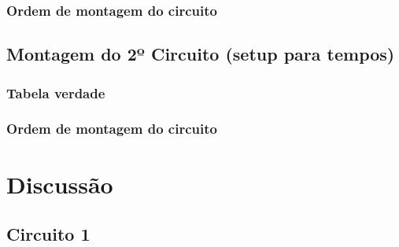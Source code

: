 \documentclass[12pts]{article}
\begin{document}
\subsubsection{Ordem de montagem do circuito}
\iffalse
\begin{itemize}
\item Primeiramente a fonte de alimentação foi escolhida e foi fixada o mesmo GND para as duas 
saidas.
\item A protoboard foi alimentada.
\item CI NAND (74LS00) foi posicionado e alimentado.
\item Os pinos 1 e 2 do CI foram ligados e a fonte de alimentação variável foi conectada no
primeiro pino.
\item O pino 3 (saida da porta NAND) foi conectado ao multímetro digital de forma a verificar
os valores de saída da porta lógica.
\item Foi aumentado o valor da fonte variável de na escala de  0,5V.
\item Os valores de saída foram anotados.
\item O CI NAND (74LS00), da familia TTL foi substituido pelo CI NAND (74HC00),
da familia CMOS, para fazer novas anotaçoes.
\item O circuito eletrônico teve comportamento de acordo com o desejado.
\end{itemize}
\fi

\subsection{Montagem do 2º Circuito (setup para tempos)}

\subsubsection{Tabela verdade}

\subsubsection{Ordem de montagem do circuito}

\section{Discussão}

\subsection{Circuito 1}
\end{document}
